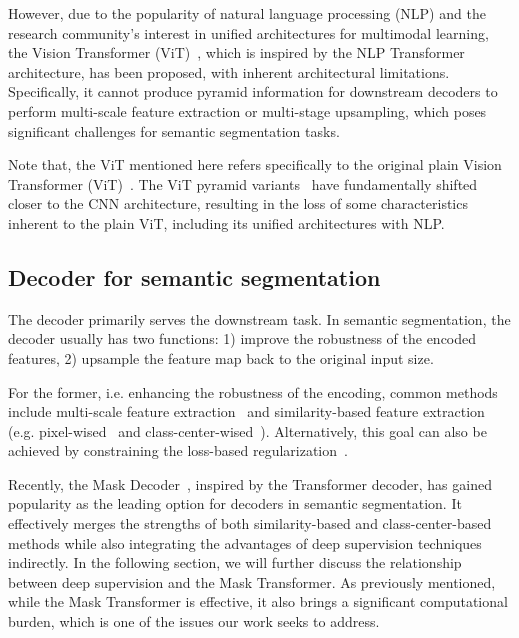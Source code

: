 However, due to the popularity of natural language processing (NLP) and the research community's interest in unified architectures for multimodal learning, the Vision Transformer (ViT)~\cite{cViT}, which is inspired by the NLP Transformer architecture, has been proposed, with inherent architectural limitations. 
Specifically, it cannot produce pyramid information for downstream decoders to perform multi-scale feature extraction or multi-stage upsampling, which poses significant challenges for semantic segmentation tasks.

Note that, the ViT mentioned here refers specifically to the original plain Vision Transformer (ViT)~\cite{cViT}. 
The ViT pyramid variants~\cite{cSwin,cMaxViT} have fundamentally shifted closer to the CNN architecture, resulting in the loss of some characteristics inherent to the plain ViT, including its unified architectures with NLP.


\subsection{Decoder for semantic segmentation}

The decoder primarily serves the downstream task. 
In semantic segmentation, the decoder usually has two functions: 1) improve the robustness of the encoded features, 2) upsample the feature map back to the original input size.

For the former, i.e. enhancing the robustness of the encoding, common methods include multi-scale feature extraction~\cite{cPSPNet,cDeepLab,cDenseASPP,cFPN} and similarity-based feature extraction (e.g. pixel-wised~\cite{cNonLocal,cDualAttention,cOCNet,cCCNet,cCFNet,cANNN,cCAA} and class-center-wised~\cite{cOCR,cACFNet}). 
Alternatively, this goal can also be achieved by constraining the loss-based regularization~\cite{cCAR,cCPN}.

Recently, the Mask Decoder~\cite{cSegmenter,cMaskFormer,cSegViT,cMask2Former}, inspired by the Transformer decoder, has gained popularity as the leading option for decoders in semantic segmentation. 
It effectively merges the strengths of both similarity-based and class-center-based methods while also integrating the advantages of deep supervision techniques~\cite{cDeeplySupervisedNets,cDeepSupervisedCNN} indirectly.
In the following section, we will further discuss the relationship between deep supervision and the Mask Transformer.
As previously mentioned, while the Mask Transformer is effective, it also brings a significant computational burden, which is one of the issues our work seeks to address.
%


